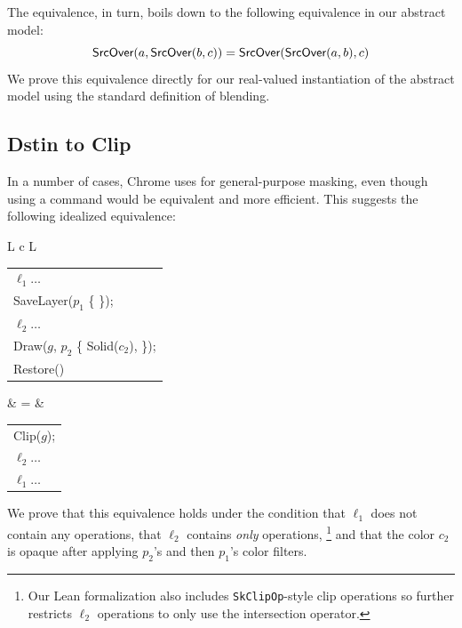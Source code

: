 \documentclass[main.tex]{subfiles}
\begin{document}
The \Layer equivalence, in turn,
  boils down to the following equivalence in our abstract model:
\[
  \textsf{SrcOver}(a, \textsf{SrcOver}(b, c)) = \textsf{SrcOver}(\textsf{SrcOver}(a, b), c)
\]
We prove this equivalence directly
  for our real-valued instantiation of the abstract model
  using the standard definition of \SrcOver blending.

\subsection{Dstin to Clip}
\label{subsec:dstin-clip}

In a number of cases, Chrome uses \dstin
  for general-purpose masking,
  even though using a \Clip command would be
  equivalent and more efficient.
This suggests the following idealized equivalence:

\begin{center}
  \begin{tabular}{L c L}
    \begin{tabular}{@{}l@{}}
      $\ell_1\ldots$ \\
      SaveLayer($p_1$ \{ \DstIn \}); \\
      \quad $\ell_2\ldots$ \\
      \quad Draw($g$, $p_2$ \{ \textsf{Solid}($c_2$), \SrcOver \}); \\
      Restore()
    \end{tabular}
    & = &
    \begin{tabular}{@{}l@{}}
      Clip($g$); \\
      $\ell_2\ldots$ \\
      $\ell_1\dots$ \\
    \end{tabular}
  \end{tabular}
\end{center}

We prove that this equivalence holds under the condition
  that $\ell_1$ does not contain any \SaveLayer operations,
  that $\ell_2$ contains \emph{only} \Clip operations,%
\footnote{
Our Lean formalization also includes \texttt{SkClipOp}-style
  clip operations so further restricts $\ell_2$ \Clip operations
  to only use the intersection operator.
}
  and that the color $c_2$ is opaque
  after applying $p_2$'s and then $p_1$'s color filters.
\end{document}
